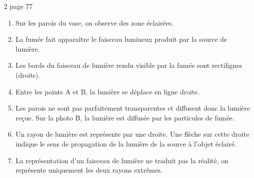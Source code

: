 \begin{myact}{2 page 77}
	\begin{enumerate}
		\item Sur les parois du vase, on observe des zone éclairées.\pause
		\item La fumée fait apparaître le faisceau lumineux produit par la source de lumière.\pause
		\item Les bords du faisceau de lumière rendu visible par la fumée sont rectilignes (droits).\pause
		\item Entre les points A et B, la lumière se déplace en ligne droite.\pause
		\item Les parois ne sont pas parfaitement transparentes et diffusent donc la lumière reçue. Sur la photo B, la lumière est diffusée par les particules de fumée.\pause
		\item Un rayon de lumière est représente par une droite. Une flèche sur cette droite indique le sens de propagation de la lumière de la source à l'objet éclairé.\pause
		\item La représentation d'un faisceau de lumière ne traduit pas la réalité, on représente uniquement les deux rayons extrêmes.
	\end{enumerate}
\end{myact}